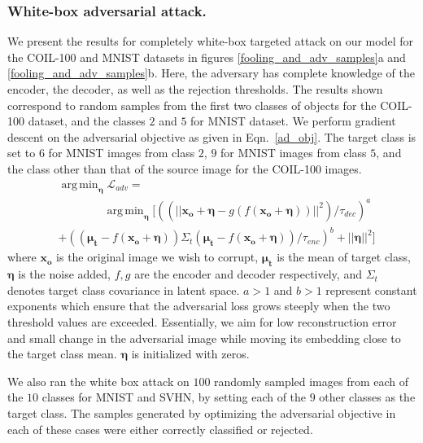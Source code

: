 \documentclass[letterpaper]{article} %
\DeclareMathOperator*{\argmin}{arg\,min}
\begin{document}
\subsubsection{White-box adversarial attack.}
\label{whitebox_attc_sec}
We present the results for completely white-box targeted attack on our model for the COIL-100 and MNIST datasets in figures \ref{fooling_and_adv_samples}a and \ref{fooling_and_adv_samples}b. Here, the adversary has complete knowledge of the encoder, the decoder, as well as the rejection thresholds. The results shown correspond to random samples from the first two classes of objects for the COIL-100 dataset, and the classes $2$ and $5$ for MNIST dataset. We perform gradient descent on the adversarial objective as given in Eqn.~\ref{ad_obj}. The target class is set to $6$ for MNIST images from class $2$, $9$ for MNIST images from class $5$, and the class other than that of the source image for the COIL-100 images.
%
\begin{equation}
\begin{split}
&\argmin_{\boldsymbol{\eta}}{\mathcal{L}_{adv}} = \\
& \qquad \qquad \argmin_\mathbf{\eta} [((||\mathbf{x_o} + \boldsymbol{\eta} - g(f(\mathbf{x_o} + \boldsymbol{\eta}))||^2)/\tau_{dec})^a \\ 
& + ((\mathbf{\mu_t} - f(\mathbf{x_o} + \mathbf{\eta}))\Sigma_t(\mathbf{\mu_t} - f(\mathbf{x_o} + \boldsymbol{\eta}))/\tau_{enc})^b + ||\boldsymbol{\eta}||^2]
\label{ad_obj}
\end{split}
\end{equation}
%
where $\mathbf{x_o}$ is the original image we wish to corrupt, $\boldsymbol{\mu_t}$ is the mean of target class, $\boldsymbol{\eta}$ is the noise added, $f, g$ are the encoder and decoder respectively, and $\Sigma_t$ denotes target class covariance in latent space. $a>1$ and $b>1$ represent constant exponents which ensure that the adversarial loss grows steeply when the two threshold values are exceeded. Essentially, we aim for low reconstruction error and small change in the adversarial image while moving its embedding close to the target class mean. $\boldsymbol{\eta}$ is initialized with zeros. 

We also ran the white box attack on $100$ randomly sampled images from each of the $10$ classes for MNIST and SVHN, by setting each of the $9$ other classes as the target class. The samples generated by optimizing the adversarial objective in each of these cases were either correctly classified or rejected.
\end{document}
